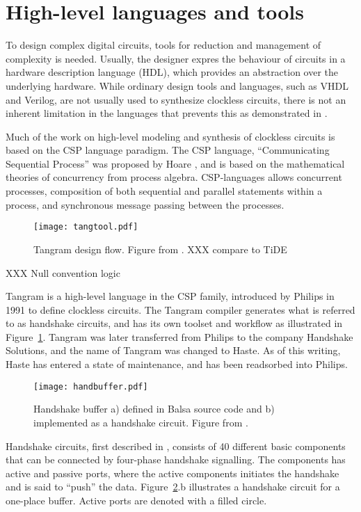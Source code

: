 \section{High-level languages and tools}
\label{sec:tools}

To design complex digital circuits, tools for reduction and management
of complexity is needed. Usually, the designer expres the behaviour of
circuits in a hardware description language (HDL), which provides an
abstraction over the underlying hardware. While ordinary design tools
and languages, such as VHDL and Verilog, are not usually used to
synthesize clockless circuits, there is not an inherent limitation in
the languages that prevents this as demonstrated in
\cite[pp. 135-137]{sparso}.

Much of the work on high-level modeling and synthesis of clockless
circuits is based on the CSP language paradigm. The CSP language,
``Communicating Sequential Process'' was proposed by Hoare \cite{csp},
and is based on the mathematical theories of concurrency from process
algebra. CSP-languages allows concurrent processes, composition of
both sequential and parallel statements within a process, and
synchronous message passing between the processes.

\begin{figure}[htbp]
  \centering
  \texttt{[image: tangtool.pdf]}
  \caption{Tangram design flow. Figure from \cite{fullscan}. XXX compare to TiDE}
  \label{fig:tangtool}
\end{figure}

XXX Null convention logic


Tangram is a high-level language in the CSP family, introduced by
Philips in 1991 to define clockless circuits. The Tangram compiler
generates what is referred to as handshake circuits, and has its own
toolset and workflow as illustrated in
Figure~\ref{fig:tangtool}. Tangram was later transferred from Philips
to the company Handshake Solutions, and the name of Tangram was
changed to Haste. As of this writing, Haste has entered a state of
maintenance, and has been readsorbed into Philips.

\begin{figure}[htbp]
  \centering
  \texttt{[image: handbuffer.pdf]}
  \caption{Handshake buffer a) defined in Balsa source code and b)
    implemented as a handshake circuit. Figure from
    \cite{taylor2008automatic}.}
  \label{fig:handbuffer}
\end{figure}

Handshake circuits, first described in \cite{12, teakxxx}, consists of
40 different basic components that can be connected by four-phase
handshake signalling. The components has active and passive ports,
where the active components initiates the handshake and is said to
``push'' the data. Figure~\ref{fig:handbuffer}.b illustrates a
handshake circuit for a one-place buffer. Active ports are denoted
with a filled circle.

